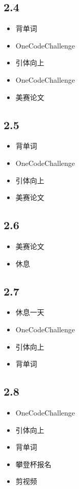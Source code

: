 \documentclass[UTF8]{ctexart}
\begin{document}
\subsection*{2.4}
\begin{itemize}
    \item 背单词
    \item OneCodeChallenge
    \item 引体向上
    \item OneCodeChallenge
    \item 美赛论文
\end{itemize}

\subsection*{2.5}
\begin{itemize}
    \item 背单词
    \item OneCodeChallenge
    \item 引体向上
    \item 美赛论文
\end{itemize}

\subsection*{2.6}
\begin{itemize}
    \item 美赛论文
    \item 休息
\end{itemize}

\subsection*{2.7}
\begin{itemize}
    \item 休息一天
    \item OneCodeChallenge
    \item 引体向上
    \item 背单词
\end{itemize}

\subsection*{2.8}
\begin{itemize}
    \item OneCodeChallenge
    \item 引体向上
    \item 背单词
    \item 攀登杯报名
    \item 剪视频
\end{itemize}
\end{document}
